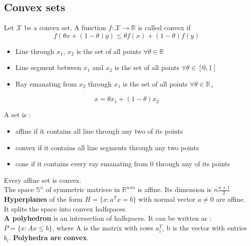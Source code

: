 \documentclass[../main.tex]{subfiles}
\begin{document}
\subsection{Convex sets}
\begin{theorem}
    Let $\mathcal{X}$ be a convex set. A function $f:\mathcal{X} \rightarrow \mathbb{R}$ is called convex if \begin{equation}
        f(\theta x + (1-\theta)y) \leq \theta f(x) + (1-\theta) f(y)
    \end{equation}
\end{theorem}
\begin{itemize}
    \item Line through $x_1$, $x_2$ is the set of all points $\forall \theta \in \mathbb{R}$\\
    \item Line segment between $x_1$ and $x_2$ is the set of all points $\forall \theta \in [0,1]$\\
    \item Ray emanating from $x_2$ through $x_1$ is the set of all points $\forall \theta \in \mathbb{R}_+$\\
\end{itemize}
\begin{equation}
    x = \theta x_1 + (1-\theta)x_2
\end{equation}

A set is :
\begin{itemize}
    \item affine if it contains all line through any two of its points\\
    \item convex if it contains all line segments through any two points\\
    \item cone if it contains every ray emanating from 0 through any of its points\\
\end{itemize}

\warning Every affine set is convex.\\
The space $\mathbb{S}^n$ of symmetric matrices in $\mathbb{R}^{nxn}$ is affine. Its dimension is $n\frac{n+1}{2}$\\

\textbf{Hyperplanes} of the form $H = \{ x : a^T x=b \}$ with normal vector $a\neq 0$ are affine. It splits the space into convex halfspaces.\\

\textbf{A polyhedron} is an intersection of halfspaces. It can be written as : $P = \{x : Ax \leq b\}$, where A is the matrix with rows $a_i^T$, b is the vector with entries $b_i$. \textbf{Polyhedra are convex}.\\
\end{document}
